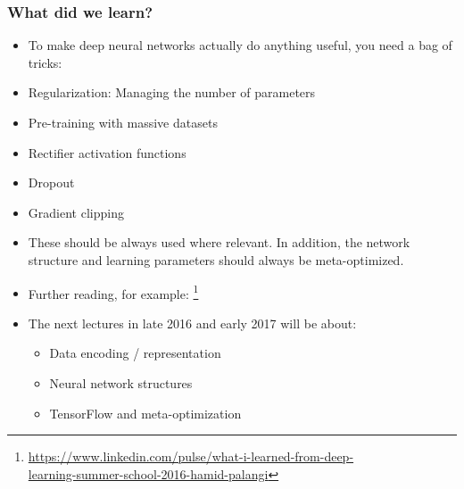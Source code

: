 \documentclass[8pt]{beamer}
\begin{document}
\begin{frame}
\frametitle{What did we learn?}
 \begin{itemize}
  \item To make deep neural networks actually do anything useful, you need a bag of tricks:
  \item Regularization: Managing the number of parameters
  \item Pre-training with massive datasets
  \item Rectifier activation functions
  \item Dropout
  \item Gradient clipping
  \item These should be always used where relevant. In addition, the network structure and learning parameters should always be meta-optimized.
  \item Further reading, for example:
        \footnote{\href{https://www.linkedin.com/pulse/what-i-learned-from-deep-learning-summer-school-2016-hamid-palangi}
        {https://www.linkedin.com/pulse/what-i-learned-from-deep-\\learning-summer-school-2016-hamid-palangi}}
  \item The next lectures in late 2016 and early 2017 will be about:
  \begin{itemize}
    \item Data encoding / representation
    \item Neural network structures
    \item TensorFlow and meta-optimization
  \end{itemize}
 \end{itemize}
\end{frame}
\end{document}
